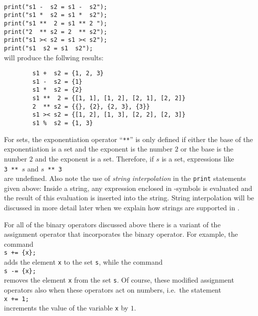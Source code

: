 \\
\hspace*{1.3cm}
\texttt{print("s1 - \ s2 = s1 - \ s2");}
\\
\hspace*{1.3cm}
\texttt{print("s1 * \ s2 = s1 * \ s2");}
\\
\hspace*{1.3cm}
\texttt{print("s1 ** \ 2  = s1 ** 2\ ");}
\\
\hspace*{1.3cm}
\texttt{print("2 \ ** s2  = 2 \ ** s2");}
\\
\hspace*{1.3cm}
\texttt{print("s1 >< s2 = s1 >< s2");}
\\
\hspace*{1.3cm}
\texttt{print("s1  \ s2 = s1  \ s2");}
\\[0.2cm]
will produce the follwing results:
\begin{verbatim}
        s1 +  s2 = {1, 2, 3}
        s1 -  s2 = {1}
        s1 *  s2 = {2}
        s1 **  2 = {[1, 1], [1, 2], [2, 1], [2, 2]}
        2  ** s2 = {{}, {2}, {2, 3}, {3}}
        s1 >< s2 = {[1, 2], [1, 3], [2, 2], [2, 3]}
        s1 %  s2 = {1, 3}
\end{verbatim}
For sets, the exponentiation operator ``\texttt{**}'' is only defined if either the base
of the exponentiation is a set and the exponent is the number $2$ or the base is the
number $2$ and the exponent is a set.  Therefore, if $s$ is a set, expressions like
\\[0.2cm]
\hspace*{1.3cm}
\texttt{3 ** $s$} \quad and \quad \texttt{$s$ ** 3}
\\[0.2cm]
are undefined. 
Also note the use of \emph{string interpolation} in the \texttt{print} statements given
above:  Inside a string, any expression enclosed in
-symbols is evaluated and the result of this evaluation is
inserted into the string.
String interpolation will be discussed in more detail later when we explain how strings are
supported in \setlx.

For all of the binary operators discussed above there is a variant of
the assignment operator that incorporates the binary operator.  For example, the command
\\[0.2cm]
\hspace*{1.3cm}
\texttt{s += \{x\};}
\\[0.2cm]
adds the element \texttt{x} to the set \texttt{s}, while the command
\\[0.2cm]
\hspace*{1.3cm}
\texttt{s -= \{x\};}
\\[0.2cm]
removes the element \texttt{x} from the set \texttt{s}.  Of course,
these modified assignment operators also when these operators act on numbers, i.e.~the statement
\\[0.2cm]
\hspace*{1.3cm}
\texttt{x += 1;}
\\[0.2cm]
increments the value of the variable \texttt{x} by $1$.
\vspace*{0.2cm}

